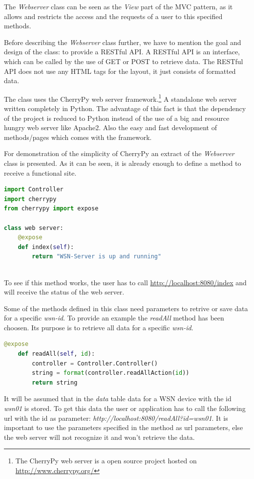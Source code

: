 The \textit{Webserver} class can be seen as the \textit{View} part of the MVC pattern, as it allows and restricts the access and the requests of a user to this specified methods.

Before describing the \textit{Webserver} class further, we have to mention the goal and design of the class: to provide a RESTful API. A RESTful API is an interface, which can be called by the use of GET or POST to retrieve data. The RESTful API does not use any HTML tags for the layout, it just consists of formatted data.

The class uses the CherryPy web server framework.\footnote{The CherryPy web server is a open source project hosted on \url{http://www.cherrypy.org/}} A standalone web server written completely in Python. The advantage of this fact is that the dependency of the project is reduced to Python instead of the use of a big and resource hungry web server like Apache2. Also the easy and fast development of methods/pages which comes with the framework.

For demonstration of the simplicity of CherryPy an extract of the \textit{Webserver} class is presented. As it can be seen, it is already enough to define a method to receive a functional site. 
\begin{lstlisting}[language=Python]
import Controller
import cherrypy
from cherrypy import expose

class web server:
    @expose
    def index(self):
        return "WSN-Server is up and running"
       
\end{lstlisting}

To see if this method works, the user has to call \url{http://localhost:8080/index} and will receive the status of the web server.

Some of the methods defined in this class need parameters to retrive or save data for a specific \textit{wsn-id}. To provide an example the \textit{readAll} method has been choosen. Its purpose is to retrieve all data for a specific \textit{wsn-id}.
\begin{lstlisting}[language=Python]
@expose
    def readAll(self, id):
        controller = Controller.Controller()
        string = format(controller.readAllAction(id))
        return string
\end{lstlisting}
It will be assumed that in the \textit{data} table data for a WSN device with the id \textit{wsn01} is stored. To get this data the user or application has to call the following url with the id as parameter: \textit{http://localhost:8080/readAll?id=wsn01}.
It is important to use the parameters specified in the method as url parameters, else the web server will not recognize it and won't retrieve the data. 

